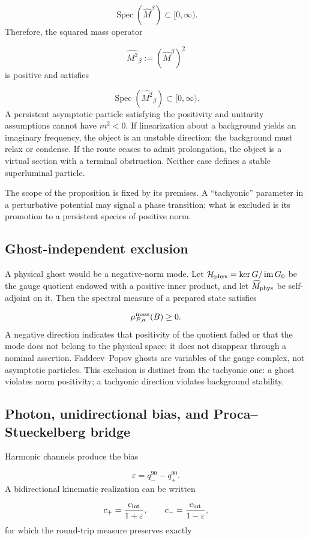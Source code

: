 \[
\operatorname{Spec}(\widehat M^\beta)\subset[0,\infty).
\]
Therefore, the squared mass operator

\[
\widehat{M^2}_{\beta}:=(\widehat M^\beta)^2
\]
is positive and satisfies

\[
\operatorname{Spec}(\widehat{M^2}_{\beta})\subset[0,\infty).
\]
A persistent asymptotic particle satisfying the positivity and unitarity assumptions cannot have \(m^2<0\). If linearization about a background yields an imaginary frequency, the object is an unstable direction: the background must relax or condense. If the route ceases to admit prolongation, the object is a virtual section with a terminal obstruction. Neither case defines a stable superluminal particle.

The scope of the proposition is fixed by its premises. A “tachyonic” parameter in a perturbative potential may signal a phase transition; what is excluded is its promotion to a persistent species of positive norm.

\subsection{Ghost-independent exclusion}
A physical ghost would be a negative-norm mode. Let \(\mathcal H_{\rm phys}=\ker G/\operatorname{im}G_0\) be the gauge quotient endowed with a positive inner product, and let \(\widehat M_{\rm phys}\) be self-adjoint on it. Then the spectral measure of a prepared state satisfies

\[
\mu_{P,a}^{\rm mass}(B)\ge0.
\]
A negative direction indicates that positivity of the quotient failed or that the mode does not belong to the physical space; it does not disappear through a nominal assertion. Faddeev--Popov ghosts are variables of the gauge complex, not asymptotic particles. This exclusion is distinct from the tachyonic one: a ghost violates norm positivity; a tachyonic direction violates background stability.

\subsection{Photon, unidirectional bias, and Proca--Stueckelberg bridge}
Harmonic channels produce the bias

\[
\varepsilon=q_-^{90}-q_+^{90}.
\]
A bidirectional kinematic realization can be written

\[
c_+=\frac{c_{\rm int}}{1+\varepsilon},
\qquad
c_-=\frac{c_{\rm int}}{1-\varepsilon},
\]
for which the round-trip measure preserves exactly

